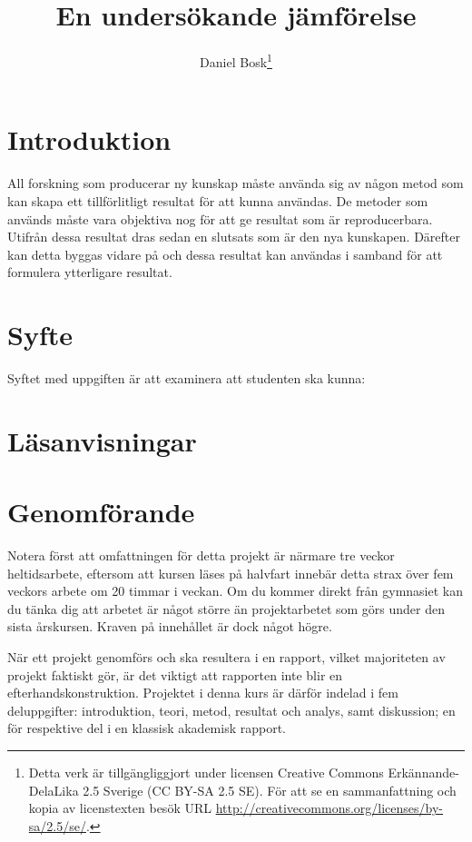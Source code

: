 \documentclass[a4paper,nocourse]{miunasgn}
\title{En undersökande jämförelse}
\author{Daniel Bosk\thanks{%
	Detta verk är tillgängliggjort under licensen Creative Commons 
	Erkännande-DelaLika 2.5 Sverige (CC BY-SA 2.5 SE).
	För att se en sammanfattning och kopia av licenstexten besök URL 
	\url{http://creativecommons.org/licenses/by-sa/2.5/se/}.
	}
}
\date{\svnId}
\begin{document}
\maketitle
\thispagestyle{foot}
\tableofcontents


\section{Introduktion}
\noindent
All forskning som producerar ny kunskap måste använda sig av någon metod som 
kan skapa ett tillförlitligt resultat för att kunna användas.
De metoder som används måste vara objektiva nog för att ge resultat som är 
reproducerbara.
Utifrån dessa resultat dras sedan en slutsats som är den nya kunskapen.
Därefter kan detta byggas vidare på och dessa resultat kan användas i samband 
för att formulera ytterligare resultat.


\section{Syfte}
\noindent
Syftet med uppgiften är att examinera att studenten ska kunna:
\begin{itemize}
  
\end{itemize}


\section{Läsanvisningar}
\noindent



\section{Genomförande}

Notera först att omfattningen för detta projekt är närmare tre veckor 
heltidsarbete, eftersom att kursen läses på halvfart innebär detta strax över 
fem veckors arbete om 20 timmar i veckan.
Om du kommer direkt från gymnasiet kan du tänka dig att arbetet är något större 
än projektarbetet som görs under den sista årskursen.
Kraven på innehållet är dock något högre.

När ett projekt genomförs och ska resultera i en rapport, vilket majoriteten av 
projekt faktiskt gör, är det viktigt att rapporten inte blir en 
efterhandskonstruktion.
Projektet i denna kurs är därför indelad i fem deluppgifter: introduktion, 
teori, metod, resultat och analys, samt diskussion; en för respektive del i en 
klassisk akademisk rapport.
\end{document}
